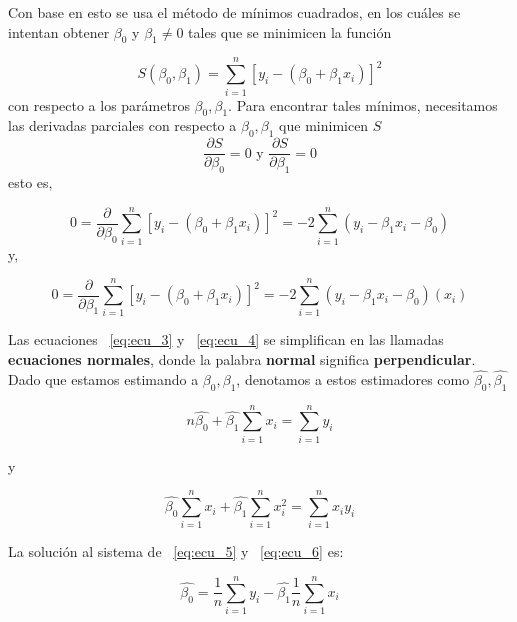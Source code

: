 \documentclass[letterpaper,12pt]{article}
\begin{document}
Con base en esto se usa el método de mínimos cuadrados, en los cuáles se intentan obtener $\beta_0$ y $\beta_1 \neq 0$ tales que se minimicen la función

\begin{equation}
S(\beta_0,\beta_1) = \sum_{i=1}^{n}[y_i - (\beta_0 + \beta_1 x_i)]^2
\label{eq:ecu_2}
\end{equation}
con respecto a los parámetros $\beta_0,\beta_1$. Para encontrar tales mínimos, necesitamos las derivadas parciales con respecto a $\beta_0,\beta_1$ que minimicen $S$\\

\[\frac{\partial S}{\partial \beta_0} = 0 \text{ y } \frac{\partial S}{\partial \beta_1} = 0\]
esto es,

\begin{equation}
	0 = \frac{\partial}{\partial \beta_0}\sum_{i=1}^{n}[y_i - (\beta_0 + \beta_1 x_i)]^2 = -2 \sum_{i=1}^{n}(y_i-\beta_1x_i-\beta_0)
	\label{eq:ecu_3}
\end{equation}
y,

\begin{equation}
0 = \frac{\partial}{\partial \beta_1}\sum_{i=1}^{n}[y_i - (\beta_0 + \beta_1 x_i)]^2 = -2 \sum_{i=1}^{n}(y_i-\beta_1x_i-\beta_0)(x_i)
\label{eq:ecu_4}
\end{equation}

Las ecuaciones ~\ref{eq:ecu_3} y ~\ref{eq:ecu_4} se simplifican en las llamadas \textbf{ecuaciones normales}, donde la palabra \textbf{normal} significa \textbf{perpendicular}. Dado que estamos estimando a $\beta_0,\beta_1$, denotamos a estos estimadores como $\hat{\beta_0},\hat{\beta_1}$

\begin{equation}
n\hat{\beta_0} + \hat{\beta_1}\sum_{i=1}^{n}x_i = \sum_{i=1}^{n}y_i 
\label{eq:ecu_5}
\end{equation}

y

\begin{equation}
\hat{\beta_0}\sum_{i=1}^{n}x_i + \hat{\beta_1}\sum_{i=1}^{n}x_i^2 = \sum_{i=1}^{n}x_i y_i
\label{eq:ecu_6}
\end{equation}

La solución al sistema de ~\ref{eq:ecu_5} y ~\ref{eq:ecu_6} es:

\begin{equation}
\hat{\beta_0} = \frac{1}{n}\sum_{i=1}^{n}y_i - \hat{\beta_1}\frac{1}{n}\sum_{i=1}^{n}x_i
\label{eq:ecu_7}
\end{equation}
\end{document}

